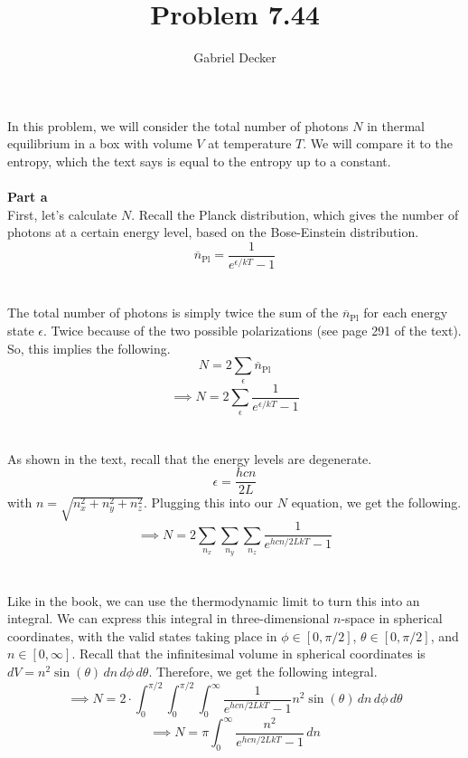 \documentclass[12pt]{article}
\title{Problem 7.44}
\author{Gabriel Decker}
\begin{document}
\maketitle
\begin{flushleft}


In this problem, we will consider the total number of photons $N$ in thermal equilibrium in a box with volume $V$ at temperature $T$.
We will compare it to the entropy, which the text says is equal to the entropy up to a constant.\\~\\

\textbf{Part a}\\
First, let's calculate $N$.
Recall the Planck distribution, which gives the number of photons at a certain energy level, based on the Bose-Einstein distribution.
\begin{equation}
    \overline{n}_\text{Pl}=\frac{1}{e^{\epsilon/kT}-1}
\end{equation}\\~\\

The total number of photons is simply twice the sum of the $\overline{n}_\text{Pl}$ for each energy state $\epsilon$.
Twice because of the two possible polarizations (see page 291 of the text).
So, this implies the following.
$$N=2\sum_\epsilon\overline{n}_\text{Pl}$$
$$\implies N=2\sum_\epsilon\frac{1}{e^{\epsilon/kT}-1}$$\\~\\

As shown in the text, recall that the energy levels are degenerate.
\begin{equation}
    \epsilon=\frac{hcn}{2L}
\end{equation}
with $n=\sqrt{n_x^2+n_y^2+n_z^2}$.
Plugging this into our $N$ equation, we get the following.
$$\implies N=2\sum_{n_x}\sum_{n_y}\sum_{n_z}\frac{1}{e^{hcn/2LkT}-1}$$\\~\\

Like in the book, we can use the thermodynamic limit to turn this into an integral.
We can express this integral in three-dimensional $n$-space in spherical coordinates, with the valid states taking place in $\phi\in[0,\pi/2]$, $\theta\in[0,\pi/2]$, and $n\in[0,\infty]$.
Recall that the infinitesimal volume in spherical coordinates is $dV=n^2\sin(\theta)\,dn\,d\phi \,d\theta$.
Therefore, we get the following integral.
$$\implies N=2\cdot\int_0^{\pi/2}\int_0^{\pi/2}\int_0^\infty\frac{1}{e^{hcn/2LkT}-1}n^2\sin(\theta)\,dn\,d\phi \,d\theta$$
$$\implies N=\pi\int_0^\infty\frac{n^2}{e^{hcn/2LkT}-1}\,dn$$\\~\\


\end{flushleft}
\end{document}
